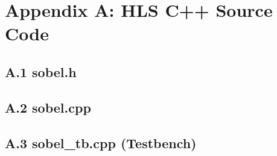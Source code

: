 \documentclass[11pt,letterpaper]{article}
\begin{document}
\newpage
\appendix
\section{Appendix A: HLS C++ Source Code}

\subsection{A.1 sobel.h}


\subsection{A.2 sobel.cpp}


\subsection{A.3 sobel\_tb.cpp (Testbench)}

\end{document}
